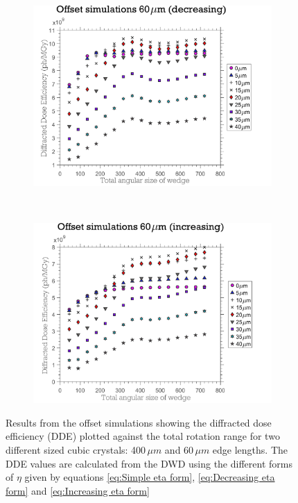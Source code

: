 \begin{figure}
    \ContinuedFloat
    \begin{subfigure}[b]{0.9\textwidth}
        \centering
        \includegraphics[width=\textwidth]{figures/dwd/OffsetSimulationDDMwrongCrystSize60.pdf}
        \caption{}
        \label{fig:Offset simulations 60 - Decreasing Eta}
    \end{subfigure}
    \\
    \begin{subfigure}[b]{0.9\textwidth}
        \centering
        \includegraphics[width=\textwidth]{figures/dwd/OffsetSimulationDDMnewCrystSize60.pdf}
        \caption{}
        \label{fig:Offset simulations 60 - Increasing Eta}
    \end{subfigure}
    \caption{Results from the offset simulations showing the diffracted dose efficiency (DDE) plotted against the total rotation range for two different sized cubic crystals: 400$\,\mu m$ and 60$\,\mu m$ edge lengths.
    The DDE values are calculated from the DWD using the different forms of $\eta$ given by equations \ref{eq:Simple eta form}, \ref{eq:Decreasing eta form} and \ref{eq:Increasing eta form}}
    \label{fig:Offset simulations}
\end{figure}

